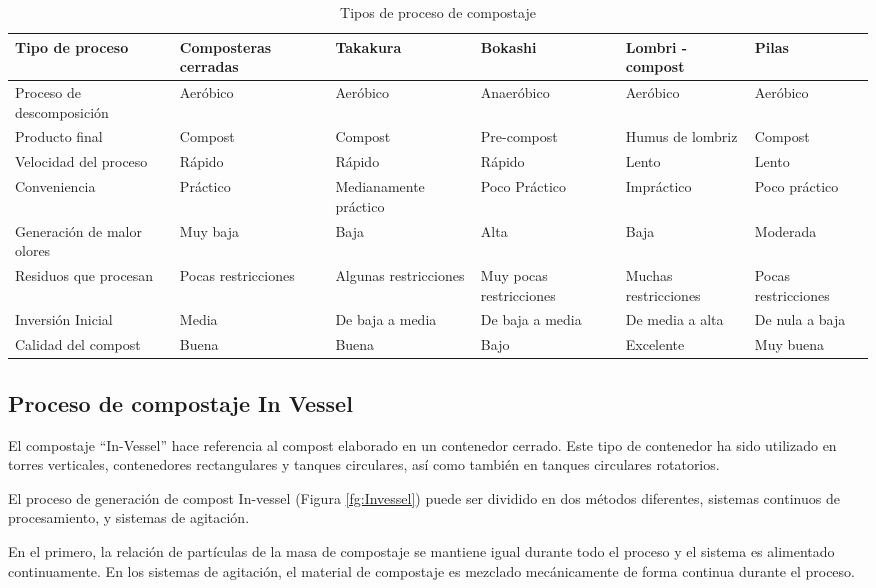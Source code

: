 \begin{table}
    \centering
\caption{Tipos de proceso de compostaje}
\label{tab:tiposcompostaje}
    \begin{tabular}{|m{2cm}|m{2cm}|m{2cm}|m{2cm}|m{2cm}|m{2cm}|} \hline 
         Tipo de proceso&  Composteras cerradas&  Takakura&  Bokashi&  Lombri - compost& Pilas\\ \hline 
         Proceso de descomposición&  Aeróbico&  Aeróbico&  Anaeróbico&  Aeróbico& Aeróbico\\ \hline 
         Producto final&  Compost&  Compost&  Pre-compost&  Humus de lombriz& Compost\\ \hline 
         Velocidad del proceso&  Rápido&  Rápido&  Rápido&  Lento& Lento\\ \hline 
         Conveniencia&  Práctico&  Medianamente práctico&  Poco Práctico&  Impráctico& Poco práctico\\ \hline 
         Generación de malor olores&  Muy baja&  Baja&  Alta &  Baja& Moderada\\ \hline 
         Residuos que procesan&  Pocas restricciones&  Algunas restricciones&  Muy pocas restricciones&  Muchas restricciones& Pocas restricciones\\ \hline 
         Inversión Inicial&  Media&  De baja a media&  De baja a media&  De media a alta& De nula a baja\\ \hline 
         Calidad del compost&  Buena&  Buena&  Bajo&  Excelente& Muy buena\\ \hline
    \end{tabular}
    
    
\end{table}

\subsection{Proceso de compostaje In Vessel}

El compostaje “In-Vessel” hace referencia al compost elaborado en un contenedor cerrado. Este tipo de contenedor ha sido utilizado en torres verticales, contenedores rectangulares y tanques circulares, así como también en tanques circulares rotatorios.

El proceso de generación de compost In-vessel (Figura \ref{fg:Invessel}) puede ser dividido en dos métodos diferentes, sistemas continuos de procesamiento, y sistemas de agitación.

En el primero, la relación de partículas de la masa de compostaje se mantiene igual durante todo el proceso y el sistema es alimentado continuamente. En los sistemas de agitación, el material de compostaje es mezclado mecánicamente de forma continua durante el proceso.


